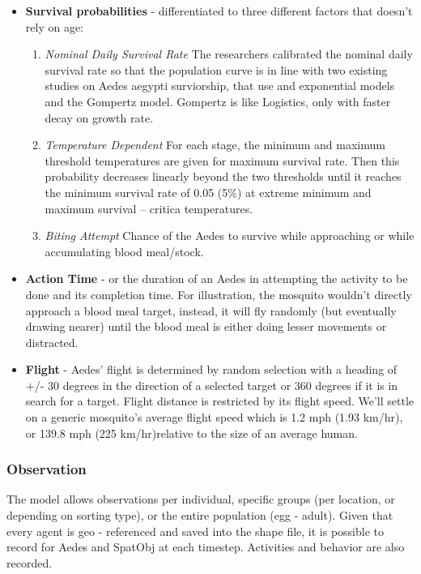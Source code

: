 \begin{itemize}

\item \textbf{Survival probabilities} - differentiated to three different factors that doesn't rely on age:
\begin{enumerate}
		\item \textit{Nominal Daily Survival Rate}
			The researchers calibrated the nominal daily survival rate so that the population curve is in line with two existing studies on Aedes aegypti surviorship, that use and exponential models and the Gompertz model\cite{yang}. Gompertz is like Logistics, only with faster decay on growth rate. 
			
		\item \textit{Temperature Dependent} 
             For each stage, the minimum and maximum threshold temperatures are given for maximum survival rate. Then this probability decreases linearly beyond the two thresholds until it reaches the minimum survival rate of 0.05 (5\%) at extreme minimum and maximum survival – critica temperatures\cite{skeeter}.
        
		\item \textit{Biting Attempt}
			Chance of the Aedes to survive while approaching or while accumulating blood meal/stock.
\end{enumerate}

	\item \textbf{Action Time} - or the duration of an Aedes in attempting the activity to be done and its completion time. For illustration, the mosquito wouldn't directly approach a blood meal target, instead, it will fly randomly (but eventually drawing nearer) until the blood meal is either doing lesser movements or distracted.
    
    \item	\textbf{Flight} - Aedes' flight is determined by random selection with a heading of +/- 30 degrees in the direction of a selected target or 360 degrees if it is in search for a target. Flight distance is restricted by its flight speed. We'll settle on a generic mosquito's average flight speed which is 1.2 mph (1.93 km/hr), or 139.8 mph (225 km/hr)relative to the size of an average human.\cite{speed}
\end{itemize}

\subsubsection{Observation}
The model allows observations per individual, specific groups (per location, or depending on sorting type), or the entire population (egg - adult). Given that every agent is geo - referenced and saved into the shape file, it is possible to record for Aedes and SpatObj at each timestep. Activities and behavior are also recorded.

